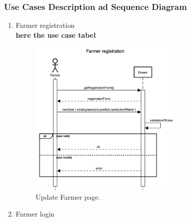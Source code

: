 \documentclass{article}
\begin{document}
\subsubsection{Use Cases Description ad Sequence Diagram}
\begin{enumerate}
    \item Farmer registration\\
    \textbf{here the use case tabel}
    \begin{figure}[H]
        \begin{center}
        \includegraphics[width=0.7\textwidth]{sequence/FarmerRegistration.png}
        \caption{Update Farmer page.}
        \label{fig:state1}
        \end{center}
    \end{figure}
    \item Farmer login
    \begin{figure}[H]
        \begin{center}

\end{center}
\end{figure}
\end{enumerate}
\end{document}
